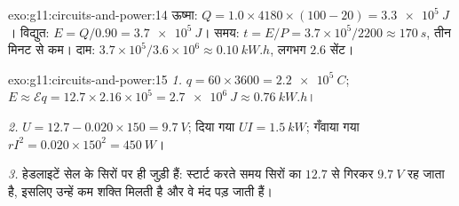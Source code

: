 \begin{solution}{exo:g11:circuits-and-power:14}
ऊष्मा: $Q = 1.0 \times 4180 \times (100 - 20) = \qty{3.3e5}{J}$। विद्युत: $E = Q/0.90 = \qty{3.7e5}{J}$। समय: $t = E/P =
3.7\times10^{5}/2200 \approx \qty{170}{s}$, तीन मिनट से कम। दाम: $3.7\times10^{5}/3.6\times10^{6} \approx \qty{0.10}{kW.h}$,
लगभग $2.6$ सेंट।
\end{solution}

\begin{solution}{exo:g11:circuits-and-power:15}
\emph{1.} $q = 60 \times 3600 = \qty{2.2e5}{C}$; $E \approx \mathcal{E}q
= 12.7 \times 2.16\times10^{5} = \qty{2.7e6}{J} \approx \qty{0.76}{kW.h}$।

\emph{2.} $U = 12.7 - 0.020 \times 150 = \qty{9.7}{V}$; दिया गया $UI = \qty{1.5}{kW}$; गँवाया गया $rI^2 = 0.020 \times 150^2 = \qty{450}{W}$।

\emph{3.} हेडलाइटें सेल के सिरों पर ही जुड़ी हैं: स्टार्ट करते समय सिरों का
 $12.7$ से गिरकर $\qty{9.7}{V}$ रह जाता है, इसलिए उन्हें कम
शक्ति मिलती है और वे मंद पड़ जाती हैं।
\end{solution}

